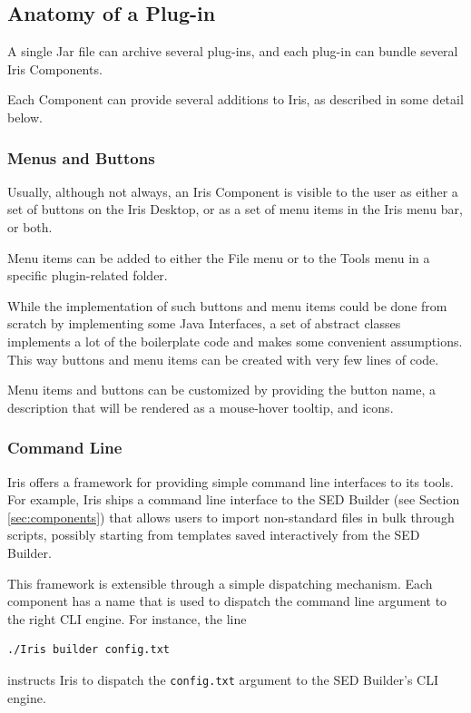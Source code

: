 \documentclass[final,5p,authoryear]{elsarticle}
\begin{document}
\subsection{Anatomy of a Plug-in} A single Jar file can archive several
plug-ins, and each plug-in can bundle several Iris Components.

Each Component can provide several additions to Iris, as described in some
detail below.

\subsubsection{Menus and Buttons} Usually, although not always, an Iris
Component is visible to the user as either a set of buttons on the Iris Desktop,
or as a set of menu items in the Iris menu bar, or both.

Menu items can be added to either the File menu or to the Tools menu in a
specific plugin-related folder.

While the implementation of such buttons and menu items could be done from
scratch by implementing some Java Interfaces, a set of abstract classes
implements a lot of the boilerplate code and makes some convenient assumptions.
This way buttons and menu items can be created with very few lines of code.

Menu items and buttons can be customized by providing the button name, a
description that will be rendered as a mouse-hover tooltip, and icons.

\subsubsection{Command Line} Iris offers a framework for providing simple
command line interfaces to its tools. For example, Iris ships a command line
interface to the SED Builder (see Section \ref{sec:components}) that allows
users to import non-standard files in bulk through scripts, possibly starting
from templates saved interactively from the SED Builder.

This framework is extensible through a simple dispatching mechanism. Each
component has a name that is used to dispatch the command line argument to the
right CLI engine. For instance, the line
\begin{lstlisting}[style=code]
./Iris builder config.txt
\end{lstlisting}
instructs Iris to dispatch the \verb|config.txt| argument to the SED Builder's
CLI engine.
\end{document}
